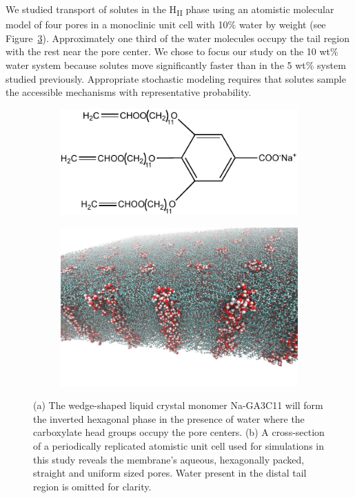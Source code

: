 \documentclass{article}
\begin{document}
  We studied transport of solutes in the H\textsubscript{II} phase using an atomistic
  molecular model of four pores in a monoclinic unit cell with 10\% water by weight 
  (see Figure~\ref{fig:membrane_structure}). Approximately one third of the water 
  molecules occupy the tail region with the rest near the pore center. We chose to
  focus our study on the 10 wt\% water system because solutes move significantly 
  faster than in the 5 wt\% system studied previously. Appropriate stochastic 
  modeling requires that solutes sample the accessible mechanisms with representative
  probability.
  
  \begin{figure}
  \centering
  \begin{subfigure}{0.4\textwidth}
  \centering
  \includegraphics[width=\textwidth]{NaGA3C11.pdf}
  \caption{}\label{fig:monomer_structure}
  \end{subfigure}
  \begin{subfigure}{0.5\textwidth}
  \centering
  \includegraphics[width=\textwidth]{membrane_profile.pdf}
  \caption{}\label{fig:membrane_profile}
  \end{subfigure}
  \caption{(a) The wedge-shaped liquid crystal monomer Na-GA3C11 will form the inverted
  hexagonal phase in the presence of water where the carboxylate head groups occupy the
  pore centers. (b) A cross-section of a periodically replicated atomistic unit cell 
  used for simulations in this study reveals the membrane's aqueous, hexagonally packed,
  straight and uniform sized pores. Water present in the distal tail region is omitted 
  for clarity.}\label{fig:membrane_structure}
  \end{figure}
  
\end{document}
